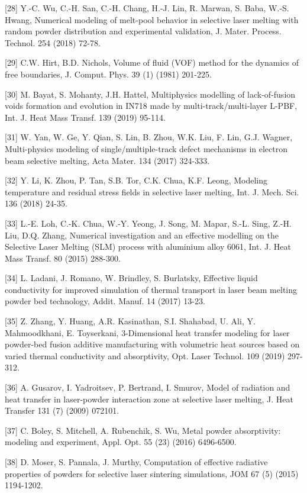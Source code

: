 \documentclass[10pt]{article}
\begin{document}
[28] Y.-C. Wu, C.-H. San, C.-H. Chang, H.-J. Lin, R. Marwan, S. Baba, W.-S. Hwang, Numerical modeling of melt-pool behavior in selective laser melting with random powder distribution and experimental validation, J. Mater. Process. Technol. 254 (2018) 72-78.

[29] C.W. Hirt, B.D. Nichols, Volume of fluid (VOF) method for the dynamics of free boundaries, J. Comput. Phys. 39 (1) (1981) 201-225.

[30] M. Bayat, S. Mohanty, J.H. Hattel, Multiphysics modelling of lack-of-fusion voids formation and evolution in IN718 made by multi-track/multi-layer L-PBF, Int. J. Heat Mass Transf. 139 (2019) 95-114.

[31] W. Yan, W. Ge, Y. Qian, S. Lin, B. Zhou, W.K. Liu, F. Lin, G.J. Wagner, Multi-physics modeling of single/multiple-track defect mechanisms in electron beam selective melting, Acta Mater. 134 (2017) 324-333.

[32] Y. Li, K. Zhou, P. Tan, S.B. Tor, C.K. Chua, K.F. Leong, Modeling temperature and residual stress fields in selective laser melting, Int. J. Mech. Sci. 136 (2018) 24-35.

[33] L.-E. Loh, C.-K. Chua, W.-Y. Yeong, J. Song, M. Mapar, S.-L. Sing, Z.-H. Liu, D.Q. Zhang, Numerical investigation and an effective modelling on the Selective Laser Melting (SLM) process with aluminium alloy 6061, Int. J. Heat Mass Transf. 80 (2015) 288-300.

[34] L. Ladani, J. Romano, W. Brindley, S. Burlatsky, Effective liquid conductivity for improved simulation of thermal transport in laser beam melting powder bed technology, Addit. Manuf. 14 (2017) 13-23.

[35] Z. Zhang, Y. Huang, A.R. Kasinathan, S.I. Shahabad, U. Ali, Y. Mahmoodkhani, E. Toyserkani, 3-Dimensional heat transfer modeling for laser powder-bed fusion additive manufacturing with volumetric heat sources based on varied thermal conductivity and absorptivity, Opt. Laser Technol. 109 (2019) 297-312.

[36] A. Gusarov, I. Yadroitsev, P. Bertrand, I. Smurov, Model of radiation and heat transfer in laser-powder interaction zone at selective laser melting, J. Heat Transfer 131 (7) (2009) 072101.

[37] C. Boley, S. Mitchell, A. Rubenchik, S. Wu, Metal powder absorptivity: modeling and experiment, Appl. Opt. 55 (23) (2016) 6496-6500.

[38] D. Moser, S. Pannala, J. Murthy, Computation of effective radiative properties of powders for selective laser sintering simulations, JOM 67 (5) (2015) 1194-1202.
\end{document}
